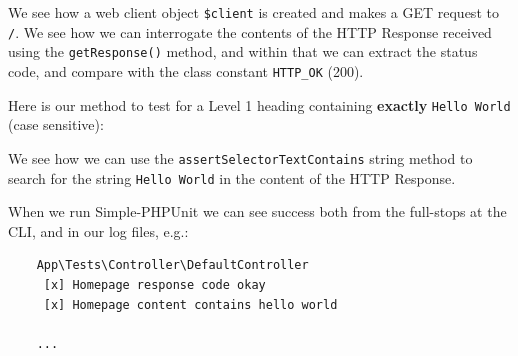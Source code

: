 \documentclass[a4paperpaper,openright]{book}
\newenvironment{Shaded}{}{}
\newcommand{\CommentTok}[1]{\textcolor[rgb]{0.38,0.63,0.69}{\textit{#1}}}
\newcommand{\KeywordTok}[1]{\textcolor[rgb]{0.00,0.44,0.13}{\textbf{#1}}}
\newcommand{\NormalTok}[1]{#1}
\newcommand{\OtherTok}[1]{\textcolor[rgb]{0.00,0.44,0.13}{#1}}
\newcommand{\StringTok}[1]{\textcolor[rgb]{0.25,0.44,0.63}{#1}}
\begin{document}
We see how a web client object \texttt{\$client} is created and makes a
GET request to \texttt{/}. We see how we can interrogate the contents of
the HTTP Response received using the \texttt{getResponse()} method, and
within that we can extract the status code, and compare with the class
constant \texttt{HTTP\_OK} (200).

Here is our method to test for a Level 1 heading containing
\textbf{exactly} \texttt{Hello\ World} (case sensitive):

\begin{Shaded}
\end{Shaded}

We see how we can use the \texttt{assertSelectorTextContains} string
method to search for the string \texttt{Hello\ World} in the content of
the HTTP Response.

When we run Simple-PHPUnit we can see success both from the full-stops
at the CLI, and in our log files, e.g.:

\begin{verbatim}
    App\Tests\Controller\DefaultController
     [x] Homepage response code okay
     [x] Homepage content contains hello world

    ...
\end{verbatim}
\end{document}
